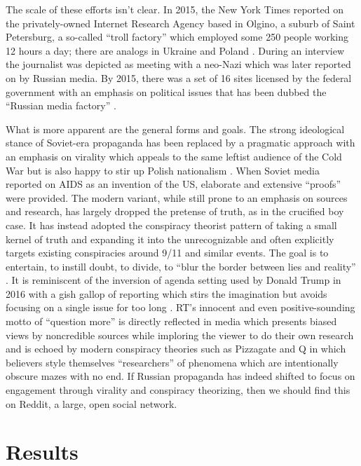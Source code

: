 The scale of these efforts isn't clear. In 2015, the New York Times reported on the privately-owned Internet Research Agency based in Olgino, a suburb of Saint Petersburg, a so-called ``troll factory'' which employed some 250 people working 12 hours a day; there are analogs in Ukraine and Poland \cite[pp. 43, 51, 97-99]{woolley2018}.
During an interview the journalist was depicted as meeting with a neo-Nazi which was later reported on by Russian media.
By 2015, there was a set of 16 sites licensed by the federal government with an emphasis on political issues that has been dubbed the ``Russian media factory'' \cite[p. 43]{woolley2018}.

What is more apparent are the general forms and goals.
The strong ideological stance of Soviet-era propaganda has been replaced by a pragmatic approach with an emphasis on virality which appeals to the same leftist audience of the Cold War but is also happy to stir up Polish nationalism \cite[pp. 23, 28, 94]{woolley2018}.
When Soviet media reported on AIDS as an invention of the US, elaborate and extensive ``proofs'' were provided.
The modern variant, while still prone to an emphasis on sources and research, has largely dropped the pretense of truth, as in the crucified boy case.
It has instead adopted the conspiracy theorist pattern of taking a small kernel of truth and expanding it into the unrecognizable and often explicitly targets existing conspiracies around 9/11 and similar events.
The goal is to entertain, to instill doubt, to divide, to ``blur the border between lies and reality'' \cite[pp. 42]{woolley2018}.
It is reminiscent of the inversion of agenda setting used by Donald Trump in 2016 with a gish gallop of reporting which stirs the imagination but avoids focusing on a single issue for too long \cite[pp. 190]{woolley2018}.
RT's innocent and even positive-sounding motto of ``question more'' is directly reflected in media which presents biased views by noncredible sources while imploring the viewer to do their own research and is echoed by modern conspiracy theories such as Pizzagate and Q in which believers style themselves ``researchers'' of phenomena which are intentionally obscure mazes with no end.
If Russian propaganda has indeed shifted to focus on engagement through virality and conspiracy theorizing, then we should find this on Reddit, a large, open social network.

\section{Results}

